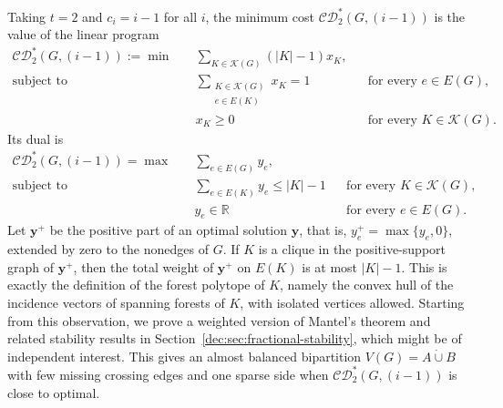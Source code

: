 \documentclass[11pt]{article}
\numberwithin{equation}{section}
\theoremstyle{remark}
\newcommand{\e}{\varepsilon}
\newcommand{\dotcupunion}{\mathbin{\dot\cup}}
\newcommand{\CDstar}{\mathcal{CD}^{*}}
\begin{document}
Taking \(t=2\) and \(c_i=i-1\) for all \(i\), the minimum cost \(\CDstar_2(G,(i-1))\) is the value of the linear program
\begin{equation*}
\begin{aligned}
 \CDstar_2(G,(i-1)):=\min\quad&
 \sum_{K\in\mathcal K(G)} (|K|-1)x_K,\\
 \text{subject to}\quad&
 \sum_{\substack{K\in\mathcal K(G)\\e\in E(K)}}x_K=1
       &&\text{for every }e\in E(G),\\
 &x_K\ge0
       &&\text{for every }K\in\mathcal K(G).
\end{aligned}
\end{equation*}
Its dual is
\begin{equation*}
\begin{aligned}
 \CDstar_2(G,(i-1))=\max\quad&
 \sum_{e\in E(G)}y_e,\\
 \text{subject to}\quad&
 \sum_{e\in E(K)}y_e\le |K|-1
       &&\text{for every }K\in\mathcal K(G),\\
 &y_e\in\mathbb R
       &&\text{for every }e\in E(G).
\end{aligned}
\end{equation*}
Let \(\mathbf{y}^+\) be the positive part of an optimal solution \(\mathbf{y}\), that is, \(y^+_e=\max\{y_e,0\}\),
extended by zero to the nonedges of \(G\). If \(K\) is a clique in the positive-support graph of \(\mathbf{y}^+\),
then the total weight of \(\mathbf{y}^+\) on \(E(K)\) is at most \(|K|-1\).
This is exactly the definition of the forest polytope of \(K\), namely the convex hull of the incidence vectors of
spanning forests of \(K\), with isolated vertices allowed. Starting from this observation, we prove a weighted version
of Mantel's theorem and related stability results in Section~\ref{dec:sec:fractional-stability}, which might be of
independent interest. This gives an almost balanced bipartition \(V(G)=A\dotcupunion B\) with few missing crossing edges
and one sparse side when \(\CDstar_2(G,(i-1))\) is close to optimal.
\end{document}
